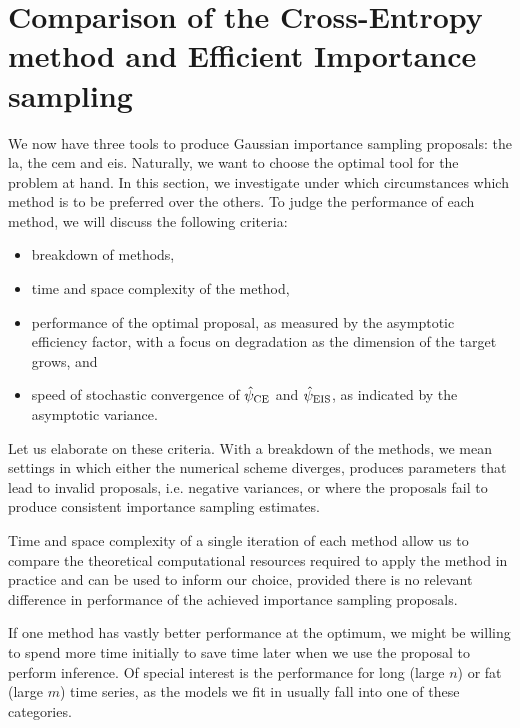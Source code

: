 \section[Comparison of the CE-method and EIS]{Comparison of the Cross-Entropy method and Efficient Importance sampling}
\label{sec:simulation_studies}

We now have three tools to produce Gaussian importance sampling proposals: the \gls{la}, the \gls{cem} and \gls{eis}. Naturally, we want to choose the optimal tool for the problem at hand. In this section, we investigate under which circumstances which method is to be preferred over the others. To judge the performance of each method, we will discuss the following criteria:
\begin{itemize}
    \item breakdown of methods,
    \item time and space complexity of the method,
    \item performance of the optimal proposal, as measured by the asymptotic efficiency factor, with a focus on degradation as the dimension of the target grows, and
    \item speed of stochastic convergence of ${\hat\psi_{\text{CE}}}$ and ${\hat\psi_{\text{EIS}}}$, as indicated by the asymptotic variance.
\end{itemize}

Let us elaborate on these criteria. With a breakdown of the methods, we mean settings in which either the numerical scheme diverges, produces parameters that lead to invalid proposals, i.e. negative variances, or where the proposals fail to produce consistent importance sampling estimates. 

Time and space complexity of a single iteration of each method allow us to compare the theoretical computational resources required to apply the method in practice and can be used to inform our choice, provided there is no relevant difference in performance of the achieved importance sampling proposals.

If one method has vastly better performance at the optimum, we might be willing to spend more time initially to save time later when we use the proposal to perform inference. Of special interest is the performance for long (large $n$) or fat (large $m$) time series, as the models we fit in  usually fall into one of these categories.

